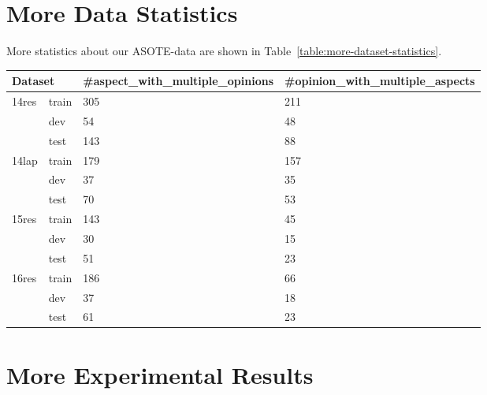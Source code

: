 \documentclass[11pt]{article}
\begin{document}
\section{More Data Statistics}
More statistics about our ASOTE-data are shown in Table~\ref{table:more-dataset-statistics}.

\begin{table*}
	\centering
	\begin{tabular}{|l|l|l|l|}
		\hline
		\multicolumn{2}{|l|}{Dataset}  & \#aspect\_with\_multiple\_opinions & \#opinion\_with\_multiple\_aspects \\ \hline
		\multirow{3}{*}{14res} & train & 305                                & 211                                \\ \cline{2-4} 
		& dev   & 54                                 & 48                                 \\ \cline{2-4} 
		& test  & 143                                & 88                                 \\ \hline
		\multirow{3}{*}{14lap} & train & 179                                & 157                                \\ \cline{2-4} 
		& dev   & 37                                 & 35                                 \\ \cline{2-4} 
		& test  & 70                                 & 53                                 \\ \hline
		\multirow{3}{*}{15res} & train & 143                                & 45                                 \\ \cline{2-4} 
		& dev   & 30                                 & 15                                 \\ \cline{2-4} 
		& test  & 51                                 & 23                                 \\ \hline
		\multirow{3}{*}{16res} & train & 186                                & 66                                 \\ \cline{2-4} 
		& dev   & 37                                 & 18                                 \\ \cline{2-4} 
		& test  & 61                                 & 23                                 \\ \hline
	\end{tabular}
	\caption{\label{table:more-dataset-statistics} More statistics.}
\end{table*}

\section{More Experimental Results}
\label{sec:Experimental_Results}
\end{document}
